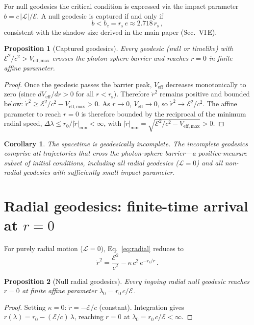 \documentclass[11pt]{article}
\newcommand{\rs}{r_{\mathrm{s}}}
\newtheorem{proposition}{Proposition}
\newtheorem{corollary}{Corollary}
\begin{document}
For null geodesics the critical condition is expressed
via the impact parameter $b = c\,|\mathcal{L}|/\mathcal{E}$.
A null geodesic is captured if and only if
\begin{equation}\label{eq:capture}
  b < b_{c} = \rs\,e \approx 2.718\,\rs\,,
\end{equation}
consistent with the shadow size derived in the main
paper (Sec.~VI\,E).

\begin{proposition}[Captured geodesics]\label{prop:captured}
Every geodesic (null or timelike) with
$\mathcal{E}^{2}/c^{2} > V_{\mathrm{eff,max}}$
crosses the photon-sphere barrier and reaches
$r = 0$ in finite affine parameter.
\end{proposition}
\begin{proof}
Once the geodesic passes the barrier peak, $V_{\mathrm{eff}}$
decreases monotonically to zero (since
$dV_{\mathrm{eff}}/dr > 0$ for all $r < \rs$).
Therefore $\dot{r}^{2}$ remains positive and bounded
below: $\dot{r}^{2} \geq
\mathcal{E}^{2}/c^{2} - V_{\mathrm{eff,max}} > 0$.
As $r \to 0$, $V_{\mathrm{eff}} \to 0$, so
$\dot{r}^{2} \to \mathcal{E}^{2}/c^{2}$.
The affine parameter to reach $r = 0$ is therefore bounded
by the reciprocal of the minimum radial speed,
$\Delta\lambda \leq r_{0}/|\dot{r}|_{\min} < \infty$, with
$|\dot{r}|_{\min}=\sqrt{\mathcal{E}^{2}/c^{2}-V_{\mathrm{eff,max}}}>0$.
\end{proof}

\begin{corollary}
The spacetime is geodesically incomplete.  The
incomplete geodesics comprise all trajectories that
cross the photon-sphere barrier---a positive-measure
subset of initial conditions, including all radial
geodesics ($\mathcal{L} = 0$) and all non-radial
geodesics with sufficiently small impact parameter.
\end{corollary}


\section{Radial geodesics: finite-time arrival at $r=0$}
\label{sec:radial}

For purely radial motion ($\mathcal{L} = 0$),
Eq.~\eqref{eq:radial} reduces to
\begin{equation}\label{eq:radial_simple}
  \dot{r}^{2} = \frac{\mathcal{E}^{2}}{c^{2}}
  - \kappa\,c^{2}\,e^{-\rs/r}\,.
\end{equation}

\begin{proposition}[Null radial geodesics]\label{prop:null}
Every ingoing radial null geodesic reaches $r = 0$
at finite affine parameter
$\lambda_{0} = r_{0}\,c/\mathcal{E}$.
\end{proposition}
\begin{proof}
Setting $\kappa = 0$: $\dot{r} = -\mathcal{E}/c$
(constant).  Integration gives
$r(\lambda) = r_{0} - (\mathcal{E}/c)\,\lambda$,
reaching $r = 0$ at
$\lambda_{0} = r_{0}\,c/\mathcal{E} < \infty$.
\end{proof}
\end{document}
